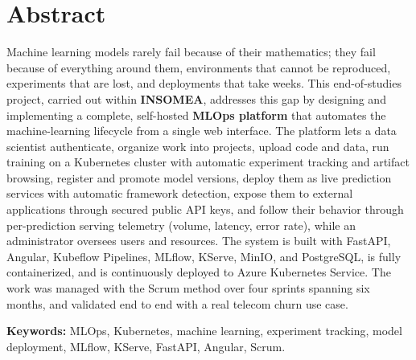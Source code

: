 \chapter*{Abstract}

Machine learning models rarely fail because of their mathematics; they fail
because of everything around them, environments that cannot be reproduced,
experiments that are lost, and deployments that take weeks. This end-of-studies
project, carried out within \textbf{INSOMEA}, addresses this gap by designing and
implementing a complete, self-hosted \textbf{MLOps platform} that automates the
machine-learning lifecycle from a single web interface. The platform lets a data
scientist authenticate, organize work into projects, upload code and data, run
training on a Kubernetes cluster with automatic experiment tracking and artifact
browsing, register and promote model versions, deploy them as live prediction
services with automatic framework detection, expose them to external applications
through secured public API keys, and follow their behavior through per-prediction
serving telemetry (volume, latency, error rate), while an administrator oversees
users and resources. The system is built with FastAPI, Angular, Kubeflow
Pipelines, MLflow, KServe, MinIO, and PostgreSQL, is fully containerized, and is
continuously deployed to Azure Kubernetes Service. The work was managed with the
Scrum method over four sprints spanning six months, and validated end to end
with a real telecom churn use case.

\vspace{0.6cm}
\noindent\textbf{Keywords:} MLOps, Kubernetes, machine learning, experiment
tracking, model deployment, MLflow, KServe, FastAPI, Angular, Scrum.

